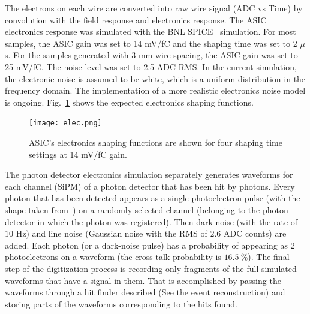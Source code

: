 
The electrons on each wire are converted into raw wire signal (ADC vs Time) by convolution with the field response and electronics response. The ASIC electronics response was simulated with the BNL SPICE~\cite{spice} simulation.  For most samples, the ASIC gain was set to 14 mV/fC and the shaping time was set to 2 $\mu$s. For the samples generated with 3 mm wire spacing, the ASIC gain was set to 25 mV/fC. The noise level was set to 2.5 ADC RMS. In the current simulation, the electronic noise is assumed to be white, which is a uniform distribution in  the frequency domain. The implementation of a more realistic electronics noise model is ongoing. Fig.~\ref{elec_resp} shows  the expected electronics shaping functions.

\begin{figure}[!h!tbp]
\texttt{[image: elec.png]}
\caption[elec-resp]{ASIC's electronics shaping functions
are shown for four shaping time settings at 14 mV/fC gain.}
\label{elec_resp}
\end{figure}


The photon detector electronics simulation separately generates waveforms 
for each channel (SiPM) of a photon detector that has been hit by photons.
Every photon that has been detected appears as a single photoelectron pulse
(with the shape taken from~\cite{http://lss.fnal.gov/archive/2015/pub/fermilab-pub-15-488-nd-ppd.pdf:2015gov}) on a randomly selected channel
(belonging to the photon detector in which the photon was registered).
Then dark noise (with the rate of $10$ Hz) and 
line noise (Gaussian noise with the RMS of $2.6$ ADC counts) are added.
Each photon (or a dark-noise pulse) has a probability of appearing
as $2$ photoelectrons on a waveform (the cross-talk probability is $16.5~\%$).
The final step of the digitization process is recording only fragments
of the full simulated waveforms that have a signal in them.
That is accomplished by passing the waveforms through a hit finder
described (See the event reconstruction)  
and storing parts of the waveforms corresponding to the hits found.


